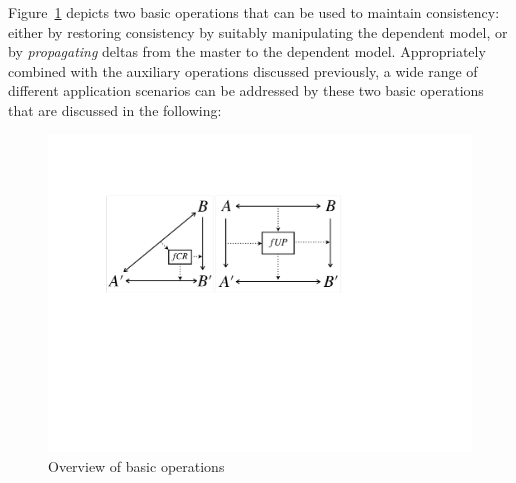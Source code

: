 Figure~\ref{fig:basicOperationsOverview} depicts two basic operations that can be used to maintain consistency:
either by restoring consistency by suitably manipulating the dependent model, or by \emph{propagating} deltas from the master to the dependent model.
Appropriately combined with the auxiliary operations discussed previously, a wide range of different application scenarios can be addressed by these two basic operations that are discussed in the following:

\begin{figure}[tb!]
	\centering
	\includegraphics[width=0.8\columnwidth]{diagrams/foundations/BasicOperations}
	\caption{Overview of basic operations}
	\label{fig:basicOperationsOverview}
\end{figure}

